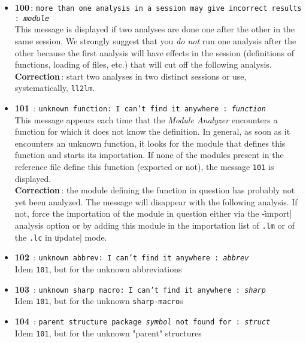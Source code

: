 \begin{itemize}
\item {\Large {\bf 100}}\,: {\tt  more than one analysis in a session may
give incorrect results : {\em module}} \\
This message is displayed if two analyses are done one after the other in the same session.  We strongly suggest that you {\it do not} run one analysis after the other because the first analysis will have effects in the session (definitions of functions, loading of files, etc.) that will cut off the following analysis.\\
{\bf Correction}\,: start two analyses in two distinct sessions or use, systematically, {\tt ll2lm}.

\item {\Large {\bf 101}}\ : {\tt unknown function: I can't find it anywhere
: {\em function}}\\
This message appears each time that the {\em Module Analyzer} encounters a function for which it does not know the definition.  In general, as soon as it encounters an unknown function, it looks for the module that defines this function and starts its importation.  If none of the modules present in the reference file define this function (exported or not), the message {\tt 101} is displayed.\\
{\bf Correction}\,: the module defining the function in question has probably not yet been analyzed.  The message will disappear with the following analysis.  If not, force the importation of the module in question either via the \|-import| analysis option or by adding this module in the importation list of {\tt .lm} or of the {\tt .lc} in \|update| mode.

\item {\Large {\bf 102}}\ : {\tt  unknown abbrev: I can't find it anywhere :
{\em abbrev} }\\
Idem {\tt 101}, but for the unknown abbreviations

\item {\Large {\bf 103}}\ : {\tt unknown sharp macro: I can't find it
anywhere : {\em sharp}}\\
Idem {\tt 101}, but for the unknown {\tt sharp-macro}s

\item {\Large {\bf 104}}\ : {\tt parent structure package {\em symbol} not found
for : {\em struct}}\\
Idem {\tt 101},  but for the unknown "parent" structures


\end{itemize}
